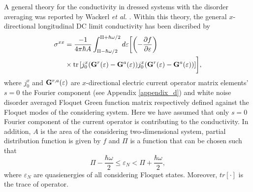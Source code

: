 
A general theory for the conductivity in dressed systems with the disorder averaging was reported by Wackerl \textit{et al.} \cite{wackerl20,wackerlthesis20}. Within this theory, the general $x$-directional longitudinal DC limit conductivity has been discribed by
\begin{equation} \label{eq_20}
  \begin{aligned}
    {\sigma}^{xx} &=
    \frac{-1}{4\pi\hbar A}
    \int_{\Pi-\hbar\omega/2}^{\Pi+ \hbar\omega/2} d\varepsilon \bigg[
    \qty(
    -\frac{\partial f}{\partial \varepsilon})
    \\
    & \times
    \tr
    \qty[
    {j}^x_0
    \qty(
    \vb{G}^{r} (\varepsilon) - \vb{G}^{a} (\varepsilon)
    )
    {j}^x_0
    \qty(
    \vb{G}^{r} (\varepsilon) - \vb{G}^{a} (\varepsilon)
    )
    ]\bigg],
  \end{aligned}
\end{equation}
where ${j}^x_0$ and $\vb{G}^{r,a} (\varepsilon)$ are $x$-directional electric current operator matrix elements' $s=0$ the Fourier component (see Appendix \ref{appendix_d}) and white noise disorder averaged Floquet Green function matrix \cite{wackerl20,wackerlthesis20} respectively defined against the Floquet modes of the considering system. Here we have assumed that only $s=0$ Fourier component of the current operator is contributing to the conductivity. In addition, $A$ is the area of the considering two-dimensional system, partial distribution function is given by $f$ and $\Pi$ is a function that can be chosen such that
\begin{equation} \label{eq_21}
    \Pi- \frac{\hbar \omega}{2}
    \leq \varepsilon_N
    <
    \Pi + \frac{\hbar \omega}{2},
\end{equation}
where $ \varepsilon_N$ are quasienergies of all considering Floquet states. Moreover, $tr[\cdot]$ is the trace of operator.

